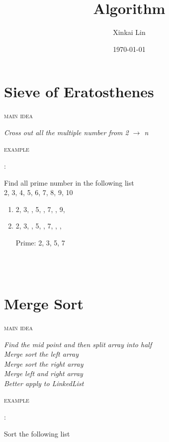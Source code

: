 \documentclass[12pt, letterpaper]{article}
\renewcommand{\maketitle}{
\begin{center}
{\Huge\bfseries
\thetitle}
\end{center}}
\newcommand{\idea}[1]{
\noindent
\begin{minipage}[t]{0.15\textwidth}
	\textsc{main idea}
\end{minipage}
\hspace{-0.8cm}\vline\hspace{0.05cm}
\begin{minipage}[t]{0.88\textwidth}
	\textit{#1}
\end{minipage}\vspace{0.25cm}}
\newcommand{\example}[1]{
\noindent
\begin{minipage}[t]{0.02\textwidth}
	\textsc{example}
\end{minipage}
\hspace{1.6cm}:\hspace{0.05cm}
\begin{minipage}[t]{0.88\textwidth}
	\textnormal{#1}
\end{minipage}\vspace{0.25cm}}
\begin{document}
\title{Algorithm}
\author{Xinkai Lin}
\date{\today}

\maketitle

\section{Sieve of Eratosthenes}
\idea{Cross out all the multiple number from 2 $\rightarrow$ n}
\example{Find all prime number in the following list \\ 
		 2, 3, 4, 5, 6, 7, 8, 9, 10}

\begin{minipage}{0.9\textwidth}
	\begin{enumerate}[Step 1:]
		\item 2, 3, , 5, , 7, , 9, 
		\item 2, 3, , 5, , 7, , , 
		
		\hspace{-1.5cm}Prime\hspace{0.09cm}: 2, 3, 5, 7
	\end{enumerate}
\end{minipage}\\\\

\section{Merge Sort}
\idea{Find the mid point and then split array into half\\
	  Merge sort the left array\\
	  Merge sort the right array\\
	  Merge left and right array\\
	  Better apply to LinkedList}
\example{Sort the following list}
\end{document}
